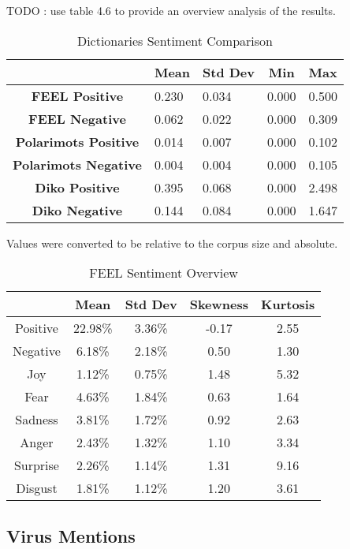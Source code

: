 TODO : use table 4.6 to provide an overview analysis of the results. 

\begin{table}[]
\centering
\begin{tabular}{@{}|c|llll|@{}}
\toprule
 & \multicolumn{1}{c}{\textbf{Mean}} & \multicolumn{1}{c}{\textbf{Std Dev}} & \multicolumn{1}{c}{\textbf{Min}} & \multicolumn{1}{c|}{\textbf{Max}} \\ \midrule
\textbf{FEEL Positive} & 0.230 & 0.034 & 0.000 & 0.500 \\
\textbf{FEEL Negative} & 0.062 & 0.022 & 0.000 & 0.309 \\
\textbf{Polarimots Positive} & 0.014 & 0.007 & 0.000 & 0.102 \\
\textbf{Polarimots Negative} & 0.004 & 0.004 & 0.000 & 0.105 \\
\textbf{Diko Positive} & 0.395 & 0.068 & 0.000 & 2.498 \\
\textbf{Diko Negative} & 0.144 & 0.084 & 0.000 & 1.647 \\ \bottomrule
\end{tabular}
\caption{Dictionaries Sentiment Comparison}
Values were converted to be relative to the corpus size and absolute.
\label{tab:dict stats}
\end{table}

\begin{table}[]
\caption{FEEL Sentiment Overview}
\label{tab:feel stats}
\centering
\begin{tabular}{@{}ccccc@{}}
\toprule
         & Mean    & Std Dev & Skewness & Kurtosis \\ \midrule
Positive & 22.98\% & 3.36\%  & -0.17  & 2.55   \\
Negative & 6.18\%  & 2.18\%  & 0.50   & 1.30   \\
Joy      & 1.12\%  & 0.75\%  & 1.48   & 5.32   \\
Fear     & 4.63\%  & 1.84\%  & 0.63   & 1.64   \\
Sadness  & 3.81\%  & 1.72\%  & 0.92   & 2.63   \\
Anger    & 2.43\%  & 1.32\%  & 1.10   & 3.34   \\
Surprise & 2.26\%  & 1.14\%  & 1.31   & 9.16   \\
Disgust  & 1.81\%  & 1.12\%  & 1.20   & 3.61   \\ \bottomrule
\end{tabular}
\end{table}

\subsection{Virus Mentions}

